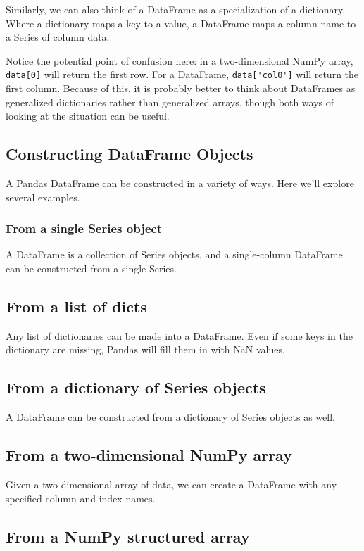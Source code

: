 Similarly, we can also think of a DataFrame as a specialization of a dictionary. Where
a dictionary maps a key to a value, a DataFrame maps a column name to a Series of
column data.

Notice the potential point of confusion here: in a two-dimensional NumPy array,
\verb|data[0]| will return the first row. For a DataFrame, \verb|data['col0']| will return the first
column. Because of this, it is probably better to think about DataFrames as generalized
dictionaries rather than generalized arrays, though both ways of looking at the situation can be useful.

\subsection*{Constructing DataFrame Objects}
A Pandas DataFrame can be constructed in a variety of ways. Here we'll explore several examples.
\subsubsection*{From a single Series object}
A DataFrame is a collection of Series objects, and a single-column DataFrame can be
constructed from a single Series.

\subsection*{From a list of dicts}

Any list of dictionaries can be made into a DataFrame. Even if some keys in the dictionary are missing, Pandas will fill them in with NaN
values.

\subsection*{From a dictionary of Series objects}
A DataFrame can be constructed from a dictionary of Series
objects as well.

\subsection*{From a two-dimensional NumPy array}
Given a two-dimensional array of data, we can create a DataFrame with any specified
column and index names.

\subsection*{From a NumPy structured array}

